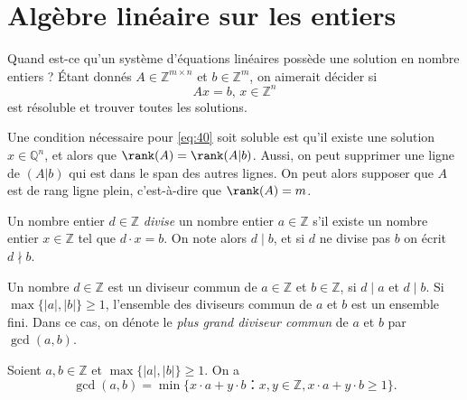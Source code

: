 \chapter{Algèbre linéaire sur les entiers}
\label{cha:algebre-lineaire-sur}
 

Quand est-ce qu'un système d'équations linéaires possède une solution en nombre entiers ? Étant donnés $A ∈ℤ^{m × n}$ et $b ∈ℤ^m$, on aimerait décider si 
\begin{equation}
  \label{eq:40}
  A x = b, \, x ∈ ℤ^n 
\end{equation}
est résoluble et trouver toutes les solutions.



Une condition nécessaire pour \eqref{eq:40} soit soluble est qu'il existe une solution $x ∈ℚ^n$, et alors que $\rank(A) = \rank(A|b)$. Aussi, on peut supprimer une ligne de $(A|b)$ qui est dans le span des autres lignes. On peut alors supposer que $A$ est de rang ligne plein, c'est-à-dire que $\rank(A) = m$. 

\begin{definition}
  \label{def:44}
  Un nombre entier $d ∈ℤ$ \emph{divise} un nombre entier $a ∈ℤ$ s'il existe un nombre entier $x ∈ℤ$ tel que $d⋅x =b$. On note alors $d\mid b$, et si $d$ ne divise pas $b$ on écrit $d \nmid b$. 
\end{definition}
\begin{definition}
  \label{def:45}
  Un nombre $d ∈ℤ$ est un diviseur commun de $a∈ℤ$ et $b ∈ℤ$, si $d \mid a$ et $d \mid b$. Si $\max\{|a|,|b|\} ≥1$, l'ensemble des diviseurs commun de $a$ et $b$ est un ensemble fini. Dans ce cas, on dénote le \emph{plus grand diviseur commun} de $a$ et $b$ par $\gcd(a,b)$. 
\end{definition}


\begin{theorem}
  \label{thr:48}
  Soient $a,b ∈ℤ$ et $\max\{|a|,|b|\} ≥1$. On a
  \begin{displaymath}
    \gcd(a,b) = \min \{ x ⋅a + y ⋅ b： x,y ∈ℤ,  x ⋅a + y ⋅ b≥1\}.
  \end{displaymath}
\end{theorem}

